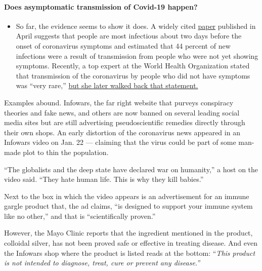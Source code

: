 \begin{itemize}
{  \paragraph{Does asymptomatic transmission of Covid-19
  happen?}\label{does-asymptomatic-transmission-of-covid-19-happen}}

  \begin{itemize}
  \tightlist
  \item
    So far, the evidence seems to show it does. A widely cited
    \href{https://www.nature.com/articles/s41591-020-0869-5}{paper}
    published in April suggests that people are most infectious about
    two days before the onset of coronavirus symptoms and estimated that
    44 percent of new infections were a result of transmission from
    people who were not yet showing symptoms. Recently, a top expert at
    the World Health Organization stated that transmission of the
    coronavirus by people who did not have symptoms was ``very rare,''
    \href{https://www.nytimes3xbfgragh.onion/2020/06/09/world/coronavirus-updates.html?action=click\&pgtype=Article\&state=default\&region=MAIN_CONTENT_3\&context=storylines_faq\#link-1f302e21}{but
    she later walked back that statement.}
  \end{itemize}
\end{itemize}

Examples abound. Infowars, the far right website that purveys conspiracy
theories and fake news, and others are now banned on several leading
social media sites but are still advertising pseudoscientific remedies
directly through their own shops. An early distortion of the coronavirus
news appeared in an Infowars video on Jan. 22 --- claiming that the
virus could be part of some man-made plot to thin the population.

``The globalists and the deep state have declared war on humanity,'' a
host on the video said. ``They hate human life. This is why they kill
babies.''

Next to the box in which the video appears is an advertisement for an
immune gargle product that, the ad claims, ``is designed to support your
immune system like no other,'' and that is ``scientifically proven.''

However, the Mayo Clinic reports that the ingredient mentioned in the
product, colloidal silver, has not been proved safe or effective in
treating disease. And even the Infowars shop where the product is listed
reads at the bottom: ``\emph{This product is not intended to diagnose,
treat, cure or prevent any disease.''}

